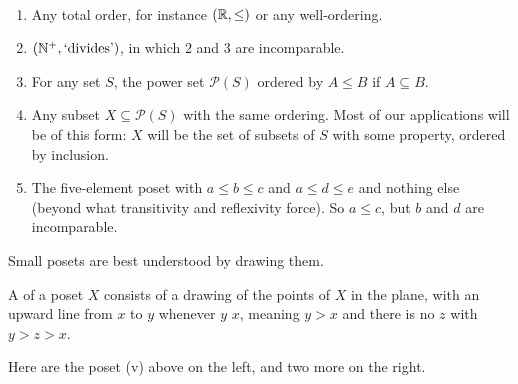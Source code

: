 \documentclass[a4paper]{scrartcl}
\begin{document}
\begin{example}[Posets]~
  \begin{enumerate}[label=(\roman*)]
    \item Any total order, for instance $(\mathbb{R}, \leq)$ or any well-ordering.
    \item $(\mathbb{N}^+, \text{`divides'})$, in which $2$ and $3$ are incomparable.
    \item For any set $S$, the power set $\mathcal{P}(S)$ ordered by $A \leq B$ if $A \subseteq B$.
    \item Any subset $X \subseteq \mathcal{P}(S)$ with the same ordering. Most of our applications will be of this form: $X$ will be the set of subsets of $S$ with some property, ordered by inclusion.
    \item The five-element poset with $a \leq b \leq c$ and $a \leq d \leq e$ and nothing else (beyond what transitivity and reflexivity force). So $a \leq c$, but $b$ and $d$ are incomparable.
  \end{enumerate}
\end{example}

Small posets are best understood by drawing them.

\begin{definition}
  A  of a poset $X$ consists of a drawing of the points of $X$ in the plane, with an upward line from $x$ to $y$ whenever $y$  $x$, meaning $y > x$ and there is no $z$ with $y > z > x$.
\end{definition}

Here are the poset (v) above on the left, and two more on the right.
\end{document}
